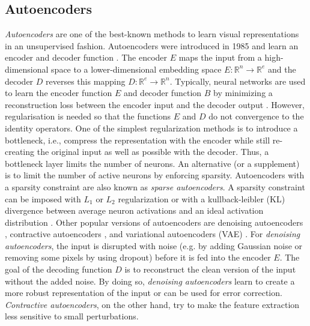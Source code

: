 \subsection{Autoencoders}
\emph{Autoencoders} are one of the best-known methods to learn visual representations in an unsupervised fashion.
Autoencoders were introduced in 1985  and learn an encoder and decoder function .
The encoder $E$ maps the input from a high-dimensional space to a lower-dimensional embedding space $E: \mathbb{R}^{n} \rightarrow \mathbb{R}^{e}$ and the decoder $D$ reverses this mapping $D: \mathbb{R}^{e} \rightarrow \mathbb{R}^{n}$.
Typically, neural networks are used to learn the encoder function $E$ and decoder function $B$ by minimizing a reconstruction loss between the encoder input and the decoder output .
However, regularisation is needed so that the functions $E$ and $D$ do not convergence to the identity operators.
One of the simplest regularization methods is to introduce a bottleneck, i.e., compress the representation with the encoder while still re-creating the original input as well as possible with the decoder.
Thus, a bottleneck layer limits the number of neurons.
An alternative (or a supplement) is to limit the number of active neurons by enforcing sparsity.
Autoencoders with a sparsity constraint are also known as \emph{sparse autoencoders}.
A sparsity constraint can be imposed with $L_1$ or $L_2$ regularization or with a kullback-leibler (KL) divergence between average neuron activations and an ideal activation distribution .
Other popular versions of autoencoders are denoising autoencoders , contractive autoencoders , and variational autoencoders (VAE) .
For \emph{denoising autoencoders}, the input is disrupted with noise (e.g. by adding Gaussian noise or removing some pixels by using dropout) before it is fed into the encoder $E$.
The goal of the decoding function $D$ is to reconstruct the clean version of the input without the added noise.
By doing so, \emph{denoising autoencoders} learn to create a more robust representation of the input or can be used for error correction.
\emph{Contractive autoencoders}, on the other hand, try to make the feature extraction less sensitive to small perturbations.
